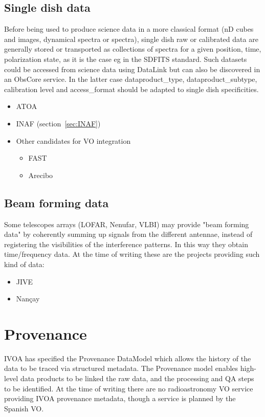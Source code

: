 \documentclass[11pt,a4paper]{ivoa}
\begin{document}
\subsection{Single dish data}
Before being used to produce science data in a more classical format (nD cubes and images, dynamical spectra or spectra),  single dish  raw or calibrated data are generally stored or transported as collections of spectra for a given position, time, polarization state, as it is the case eg in the SDFITS standard. Such datasets could be accessed from science data using DataLink but can also be discovered in an ObsCore service. In the latter case dataproduct\_type, dataproduct\_subtype, calibration level and access\_format should be adapted to single dish specificities.
\begin{itemize}
\item ATOA 
\item INAF (section~\ref{sec:INAF})
\item Other candidates for VO integration
\begin{itemize}
\item  FAST
\item Arecibo
\end{itemize}
\end{itemize}
\subsection{Beam forming data}
Some telescopes arrays (LOFAR, Nenufar, VLBI) may provide "beam forming data" by coherently summing up signals from the different antennae, instead of registering the visibilities of the interference patterns. In this way they obtain time/frequency data. At the time of writing these are the projects providing such kind of data:
\begin{itemize}
\item JIVE
\item Nan\c cay
\end{itemize}
\section{Provenance}

IVOA has specified the Provenance DataModel \citep{2020ivoa.spec.0411S} which allows the history of the data to be traced via structured metadata. The Provenance model enables high-level data products to be linked the raw data, and the processing and QA steps to be identified. At the time of writing there are no radioastronomy VO service providing IVOA provenance metadata, though a service is planned by the Spanish VO.   
\end{document}
